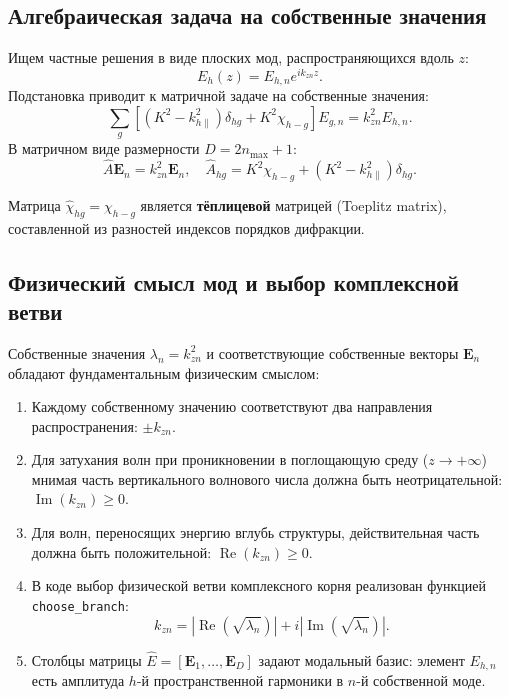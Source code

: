 \documentclass[a4paper,11pt]{article}
\begin{document}
\subsection{Алгебраическая задача на собственные значения}
Ищем частные решения в виде плоских мод, распространяющихся вдоль $z$:
\begin{equation}
E_h(z) = E_{h,n} e^{i k_{zn} z}.
\end{equation}
Подстановка приводит к матричной задаче на собственные значения:
\begin{equation}
\sum_{g} \left[ (K^2 - k_{h\parallel}^2)\delta_{hg} + K^2 \chi_{h-g} \right] E_{g,n} = k_{zn}^2 E_{h,n}.
\end{equation}
В матричном виде размерности $D = 2n_{\max} + 1$:
\begin{equation}
\hat{A} \mathbf{E}_n = k_{zn}^2 \mathbf{E}_n, \quad \hat{A}_{hg} = K^2 \chi_{h-g} + (K^2 - k_{h\parallel}^2)\delta_{hg}.
\label{eq:eigenvalue_problem}
\end{equation}

Матрица $\hat{\chi}_{hg} = \chi_{h-g}$ является \textbf{тёплицевой} матрицей (Toeplitz matrix), составленной из разностей индексов порядков дифракции.

\subsection{Физический смысл мод и выбор комплексной ветви}
Собственные значения $\lambda_n = k_{zn}^2$ и соответствующие собственные векторы $\mathbf{E}_n$ обладают фундаментальным физическим смыслом:
\begin{enumerate}
    \item Каждому собственному значению соответствуют два направления распространения: $\pm k_{zn}$.
    \item Для затухания волн при проникновении в поглощающую среду ($z \to +\infty$) мнимая часть вертикального волнового числа должна быть неотрицательной: $\operatorname{Im}(k_{zn}) \ge 0$.
    \item Для волн, переносящих энергию вглубь структуры, действительная часть должна быть положительной: $\operatorname{Re}(k_{zn}) \ge 0$.
    \item В коде выбор физической ветви комплексного корня реализован функцией \texttt{choose\_branch}:
    \begin{equation}
    k_{zn} = |\operatorname{Re}(\sqrt{\lambda_n})| + i |\operatorname{Im}(\sqrt{\lambda_n})|.
    \end{equation}
    \item Столбцы матрицы $\hat{E} = [\mathbf{E}_1, \dots, \mathbf{E}_D]$ задают модальный базис: элемент $E_{h,n}$ есть амплитуда $h$-й пространственной гармоники в $n$-й собственной моде.
\end{enumerate}
\end{document}
